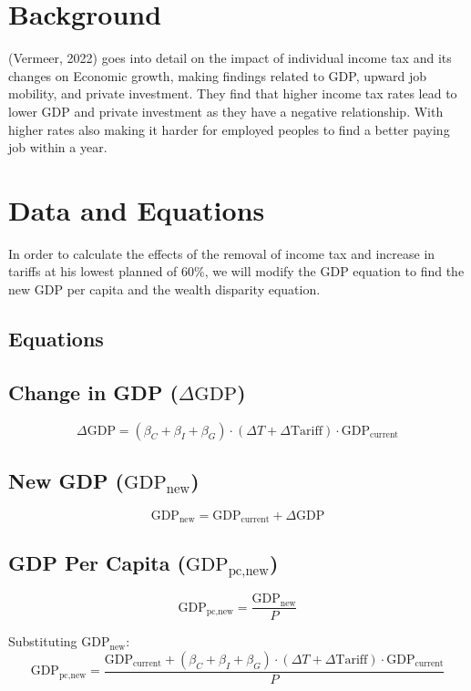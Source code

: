 \documentclass[12pt,letterpaper]{article}
\begin{document}
 
\section{Background}

\indent (Vermeer, 2022) goes into detail on the impact of individual income tax and its changes on Economic growth, making findings related to GDP, upward job mobility, and private investment. They find that higher income tax rates lead to lower GDP and private investment as they have a negative relationship. With higher rates also making it harder for employed peoples to find a better paying job within a year.     

\section{Data and Equations}

\indent In order to calculate the effects of the removal of income tax and increase in tariffs at his lowest planned of 60\%, we will modify the GDP equation to find the new GDP per capita and the wealth disparity equation.

\subsection{Equations}

\subsection*{Change in GDP (\( \Delta \text{GDP} \))}

\[
\Delta \text{GDP} = (\beta_C + \beta_I + \beta_G) \cdot (\Delta T + \Delta \text{Tariff}) \cdot \text{GDP}_{\text{current}}
\]

\subsection*{New GDP (\( \text{GDP}_{\text{new}} \))}

\[
\text{GDP}_{\text{new}} = \text{GDP}_{\text{current}} + \Delta \text{GDP}
\]

\subsection*{GDP Per Capita (\( \text{GDP}_{\text{pc,new}} \))}

\[
\text{GDP}_{\text{pc,new}} = \frac{\text{GDP}_{\text{new}}}{P}
\]

Substituting \( \text{GDP}_{\text{new}} \):
\[
\text{GDP}_{\text{pc,new}} = \frac{\text{GDP}_{\text{current}} + (\beta_C + \beta_I + \beta_G) \cdot (\Delta T + \Delta \text{Tariff}) \cdot \text{GDP}_{\text{current}}}{P}
\]
\end{document}
